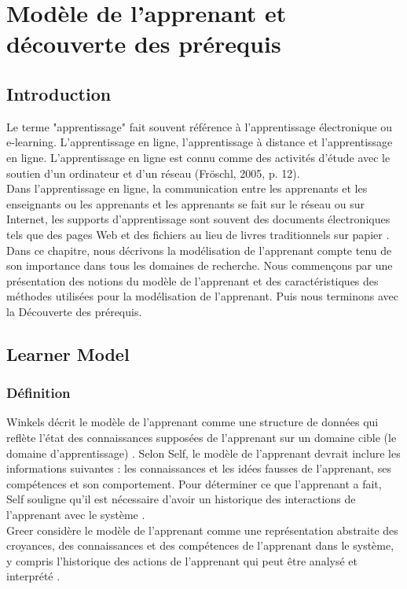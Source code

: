\chapter{Modèle de l'apprenant et découverte des prérequis} 
\minitoc
\thispagestyle{empty}
\newpage
\section{Introduction}
Le terme "apprentissage" fait souvent référence à l'apprentissage électronique ou e-learning. L’apprentissage en ligne, l'apprentissage à distance et l'apprentissage en ligne. L'apprentissage en ligne est connu comme des activités d'étude avec le soutien d'un ordinateur et d'un réseau (Fröschl, 2005, p. 12). \\
Dans l'apprentissage en ligne, la communication entre les apprenants et les enseignants ou les apprenants et les apprenants se fait sur le réseau ou sur Internet, les supports d'apprentissage sont souvent des documents électroniques tels que des pages Web et des fichiers au lieu de livres traditionnels sur papier \cite{learner_model__adaptive_learning}. Dans ce chapitre, nous décrivons la modélisation de l'apprenant compte tenu de son importance dans tous les domaines de recherche. Nous commençons par une présentation des notions du modèle de l'apprenant et des caractéristiques des méthodes utilisées pour la modélisation de l'apprenant. Puis nous terminons avec la Découverte des prérequis.

\section{Learner Model}

\subsection{Définition}
Winkels décrit le modèle de l'apprenant comme une structure de données qui reflète l'état des connaissances supposées de l'apprenant sur un domaine cible (le domaine d'apprentissage) \cite{user_modelling_help_systems}. Selon Self, le modèle de l'apprenant devrait inclure les informations suivantes : les connaissances et les idées fausses de l'apprenant, ses compétences et son comportement. Pour déterminer ce que l’apprenant a fait, Self souligne qu’il est nécessaire d’avoir un historique des interactions de l’apprenant avec le système \cite{user_learner_modeling_workbench}. \\
Greer considère le modèle de l'apprenant comme une représentation abstraite des croyances, des connaissances et des compétences de l'apprenant dans le système, y compris l'historique des actions de l'apprenant qui peut être analysé et interprété \cite{psycho_oncology}.

